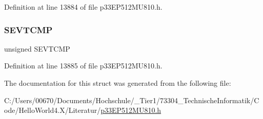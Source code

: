 Definition at line 13884 of file p33\+E\+P512\+M\+U810.\+h.

\mbox{\label{structtag_s_e_v_t_c_m_p_b_i_t_s_ab4b5aa9011f46cebf292d1eb68b5dd4d}} 
\subsubsection{\texorpdfstring{S\+E\+V\+T\+C\+MP}{SEVTCMP}}
{\footnotesize\ttfamily unsigned S\+E\+V\+T\+C\+MP}



Definition at line 13885 of file p33\+E\+P512\+M\+U810.\+h.



The documentation for this struct was generated from the following file\+:\begin{DoxyCompactItemize}
\item 
C\+:/\+Users/00670/\+Documents/\+Hochschule/\+\_\+\+Tier1/73304\+\_\+\+Technische\+Informatik/\+Code/\+Hello\+World4.\+X/\+Literatur/\hyperlink{p33_e_p512_m_u810_8h}{p33\+E\+P512\+M\+U810.\+h}\end{DoxyCompactItemize}
